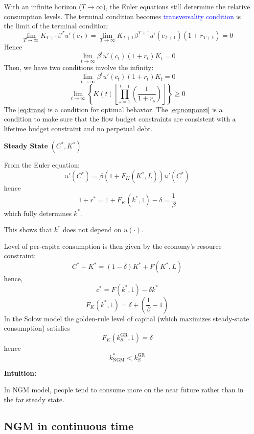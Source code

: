 \documentclass{article}
\begin{document}
With an infinite horizon ($T \to \infty$), the Euler equations still determine the relative consumption levels. The terminal condition becomes \textcolor{blue}{transversality condition} is the limit of the terminal condition:
\[ \lim_{T \to \infty} K_{T + 1}\beta^T u'(c_T) = \lim_{T \to \infty} K_{T + 1}\beta^{T + 1}u'(c_{T + 1})(1 + r_{T + 1}) = 0 \]
Hence
\[ \lim_{t \to \infty} \beta^t u'(c_t)(1 + r_t)K_t = 0 \]
Then, we have two conditions involve the infinity:
\begin{equation}
    \lim_{t \to \infty} \beta^t u'(c_t)(1 + r_t)K_t = 0 \label{eq:trans}
\end{equation}
\begin{equation}
    \lim_{t \to \infty} \left\{K(t)\left[\prod_{s = 1}^{t-1} \left(\frac{1}{1 + r_s}\right)\right]\right\} \geq 0 \label{eq:nonponzi}
\end{equation}
The \eqref{eq:trans} is a condition for optimal behavior. The \eqref{eq:nonponzi} is a condition to make sure that the flow budget constraints are consistent with a lifetime budget constraint and no perpetual debt.

\textbf{Steady State} $(C^*, K^*)$

From the Euler equation:
\[ u'(C^*) = \beta(1 + F_K(K^*, L))u'(C^*) \]
hence
\[ 1 + r^* = 1 + F_K(k^*, 1) - \delta = \frac{1}{\beta} \]
which fully determines $k^*$.

\begin{note}
This shows that $k^*$ does not depend on $u(\cdot)$.
\end{note}

Level of per-capita consumption is then given by the economy's resource constraint:
\[ C^* + K^* = (1 - \delta)K^* + F(K^*, L) \]
hence,
\[ c^* = F(k^*, 1) - \delta k^* \]
\[ F_K(k^*, 1) = \delta + \left(\frac{1}{\beta} - 1\right) \]
In the Solow model the golden-rule level of capital (which maximizes steady-state consumption) satisfies
\[ F_K(k_S^{\text{GR}}, 1) = \delta \]
hence
\[ k^*_{\text{NGM}} < k_S^{\text{GR}} \]

\begin{note}
\textbf{Intuition:}

In NGM model, people tend to consume more on the near future rather than in the far steady state.
\end{note}

\subsection{NGM in continuous time}
\end{document}
